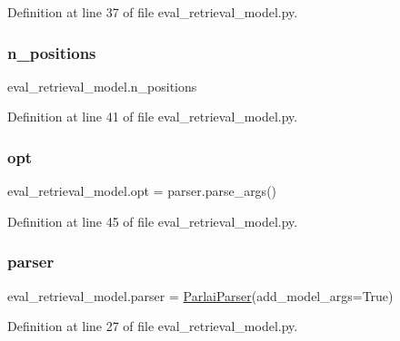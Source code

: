 Definition at line 37 of file eval\+\_\+retrieval\+\_\+model.\+py.

\mbox{\label{namespaceeval__retrieval__model_aefd3b530525f81a145c28ecf885b3562}} 
\subsubsection{\texorpdfstring{n\+\_\+positions}{n\_positions}}
{\footnotesize\ttfamily eval\+\_\+retrieval\+\_\+model.\+n\+\_\+positions}



Definition at line 41 of file eval\+\_\+retrieval\+\_\+model.\+py.

\mbox{\label{namespaceeval__retrieval__model_a73dfea10f7d1bae03058e230ace44590}} 
\subsubsection{\texorpdfstring{opt}{opt}}
{\footnotesize\ttfamily eval\+\_\+retrieval\+\_\+model.\+opt = parser.\+parse\+\_\+args()}



Definition at line 45 of file eval\+\_\+retrieval\+\_\+model.\+py.

\mbox{\label{namespaceeval__retrieval__model_a7f95ba8d39c8bbf9f0104be63a1fc6e9}} 
\subsubsection{\texorpdfstring{parser}{parser}}
{\footnotesize\ttfamily eval\+\_\+retrieval\+\_\+model.\+parser = \hyperlink{classparlai_1_1core_1_1params_1_1ParlaiParser}{Parlai\+Parser}(add\+\_\+model\+\_\+args=True)}



Definition at line 27 of file eval\+\_\+retrieval\+\_\+model.\+py.

